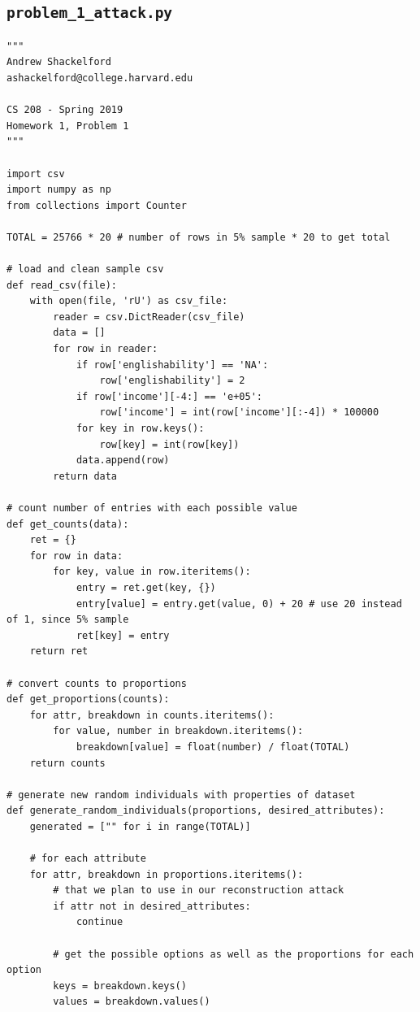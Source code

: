 \documentclass[12pt]{article}
\def\cl{\lstinline}
\begin{document}
\begin{appendices}

\section{\cl{problem_1_attack.py}}
\label{appendix:problem_1_attack}

\begin{lstlisting}
"""
Andrew Shackelford
ashackelford@college.harvard.edu

CS 208 - Spring 2019
Homework 1, Problem 1
"""

import csv
import numpy as np
from collections import Counter

TOTAL = 25766 * 20 # number of rows in 5% sample * 20 to get total

# load and clean sample csv
def read_csv(file):
    with open(file, 'rU') as csv_file:
        reader = csv.DictReader(csv_file)
        data = []
        for row in reader:
            if row['englishability'] == 'NA':
                row['englishability'] = 2
            if row['income'][-4:] == 'e+05':
                row['income'] = int(row['income'][:-4]) * 100000
            for key in row.keys():
                row[key] = int(row[key])
            data.append(row)
        return data

# count number of entries with each possible value
def get_counts(data):
    ret = {}
    for row in data:
        for key, value in row.iteritems():
            entry = ret.get(key, {})
            entry[value] = entry.get(value, 0) + 20 # use 20 instead of 1, since 5% sample
            ret[key] = entry
    return ret

# convert counts to proportions
def get_proportions(counts):
    for attr, breakdown in counts.iteritems():
        for value, number in breakdown.iteritems():
            breakdown[value] = float(number) / float(TOTAL)
    return counts

# generate new random individuals with properties of dataset
def generate_random_individuals(proportions, desired_attributes):
    generated = ["" for i in range(TOTAL)]

    # for each attribute
    for attr, breakdown in proportions.iteritems():
        # that we plan to use in our reconstruction attack
        if attr not in desired_attributes:
            continue

        # get the possible options as well as the proportions for each option
        keys = breakdown.keys()
        values = breakdown.values()


\end{lstlisting}
\end{appendices}
\end{document}
